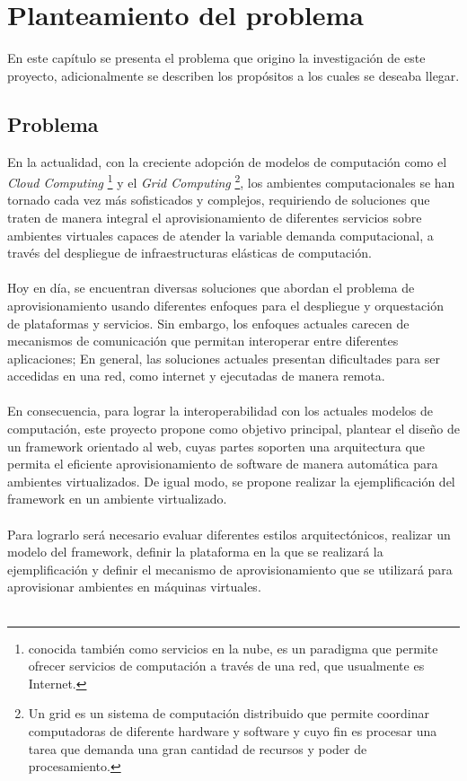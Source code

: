 \chapter{Planteamiento del problema}
\label{capproblema}

En este capítulo se presenta el problema que origino la investigación de este proyecto, adicionalmente se describen los propósitos a los cuales se deseaba llegar. 

\section{Problema}
En la actualidad, con la creciente adopción de modelos de computación como el \emph{Cloud Computing} \footnote{conocida también como servicios en la nube, es un paradigma que permite ofrecer servicios de computación a través de una red, que usualmente es Internet.} y el \emph{Grid Computing} \footnote{Un grid es un sistema de computación distribuido que permite coordinar computadoras de diferente hardware y software y cuyo fin es procesar una tarea que demanda una gran cantidad de recursos y poder de procesamiento.}, los ambientes computacionales se han tornado cada vez más sofisticados y complejos, requiriendo de soluciones que traten de manera integral el aprovisionamiento de diferentes servicios sobre ambientes virtuales capaces de atender la variable demanda computacional, a través del despliegue de infraestructuras elásticas de computación.\\
\\
Hoy en día, se encuentran diversas soluciones que abordan el problema de aprovisionamiento usando diferentes enfoques para el despliegue y orquestación de plataformas y servicios. Sin embargo, los enfoques actuales carecen de mecanismos de comunicación que permitan interoperar entre diferentes aplicaciones; En general, las soluciones actuales presentan dificultades para ser accedidas en una red, como internet y ejecutadas de manera remota.\\
\\
En consecuencia, para lograr la interoperabilidad con los actuales modelos de computación, este proyecto propone como objetivo principal, plantear el diseño de un framework orientado al web, cuyas partes soporten una arquitectura que permita el eficiente aprovisionamiento de software de manera automática para ambientes virtualizados. De igual modo, se propone realizar la ejemplificación del framework en un ambiente virtualizado.\\
\\
Para lograrlo será necesario evaluar diferentes estilos arquitectónicos, realizar un modelo del framework, definir la plataforma en la que se realizará la ejemplificación y definir el mecanismo de aprovisionamiento que se utilizará para aprovisionar ambientes en máquinas virtuales.\\ 
\\

